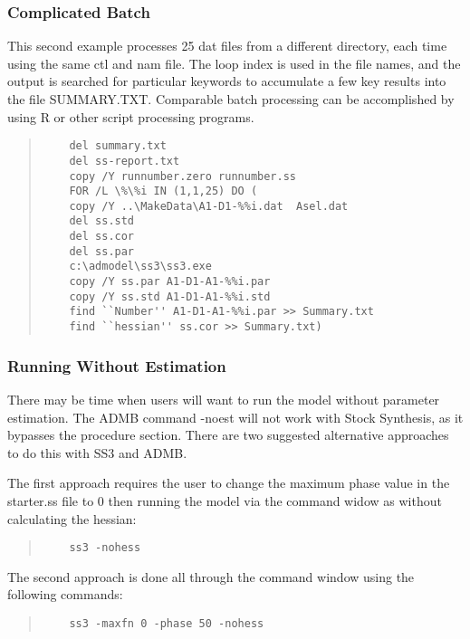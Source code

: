 \subsubsection{Complicated Batch}
This second example processes 25 dat files from a different directory, each time using the same ctl and nam file. The loop index is used in the file names, and the output is searched for particular keywords to accumulate a few key results into the file SUMMARY.TXT. Comparable batch processing can be accomplished by using R or other script processing programs.

\begin{quote}
	\begin{verbatim}
	del summary.txt
	del ss-report.txt
	copy /Y runnumber.zero runnumber.ss
	FOR /L \%\%i IN (1,1,25) DO (
	copy /Y ..\MakeData\A1-D1-%%i.dat  Asel.dat
	del ss.std
	del ss.cor
	del ss.par
	c:\admodel\ss3\ss3.exe
	copy /Y ss.par A1-D1-A1-%%i.par
	copy /Y ss.std A1-D1-A1-%%i.std
	find ``Number'' A1-D1-A1-%%i.par >> Summary.txt
	find ``hessian'' ss.cor >> Summary.txt)
	\end{verbatim}
\end{quote}


\hypertarget{NoEst}{}
\subsubsection{Running Without Estimation}
There may be time when users will want to run the model without parameter estimation. The ADMB command -noest will not work with Stock Synthesis, as it bypasses the procedure section. There are two suggested alternative approaches to do this with SS3 and ADMB.  

The first approach requires the user to change the maximum phase value in the starter.ss file to 0 then running the model via the command widow as without calculating the hessian:

\begin{quote}
	\begin{verbatim}
	ss3 -nohess
	\end{verbatim}
\end{quote}

The second approach is done all through the command window using the following commands:

\begin{quote}
	\begin{verbatim}
	ss3 -maxfn 0 -phase 50 -nohess
	\end{verbatim}
\end{quote}

